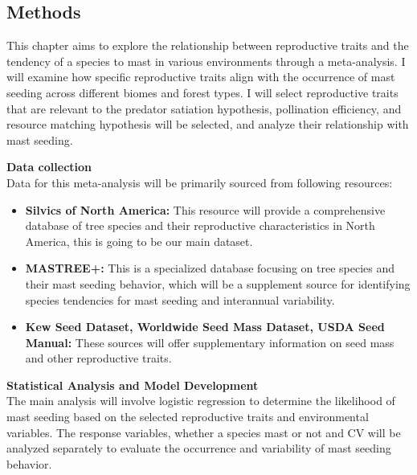 \documentclass[11pt,letter]{article}
\begin{document}
\subsection{Methods}
This chapter aims to explore the relationship between reproductive traits and the tendency of a species to mast in various environments through a meta-analysis. I will examine how specific reproductive traits align with the occurrence of mast seeding across different biomes and forest types. I will select reproductive traits that are relevant to the predator satiation hypothesis, pollination efficiency, and resource matching hypothesis will be selected, and analyze their relationship with mast seeding.\par
\textbf{Data collection}\\
Data for this meta-analysis will be primarily sourced from following resources:
	\begin{itemize}
	\item \textbf{Silvics of North America:} This resource will provide a comprehensive database of tree species and their reproductive characteristics in North America, this is going to be our main dataset.
	\item \textbf{MASTREE+:} This is a specialized database focusing on tree species and their mast seeding behavior, which will be a supplement source for identifying species tendencies for mast seeding and interannual variability.
	\item \textbf{Kew Seed Dataset, Worldwide Seed Mass Dataset, USDA Seed Manual:} These sources will offer supplementary information on seed mass and other reproductive traits.
	\end{itemize}
\textbf{Statistical Analysis and Model Development}\\
The main analysis will involve logistic regression to determine the likelihood of mast seeding based on the selected reproductive traits and environmental variables. The response variables, whether a species mast or not and CV will be analyzed separately to evaluate the occurrence and variability of mast seeding behavior.
\end{document}
